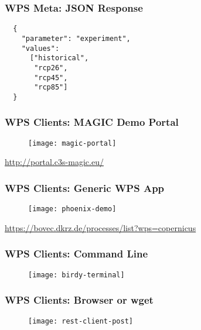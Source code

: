 \documentclass{beamer}
\begin{document}
\begin{frame}[fragile]
\frametitle<presentation>{WPS Meta: JSON Response}
  \lstset{language=JSON}
  \begin{lstlisting}
  {
    "parameter": "experiment",
    "values":
      ["historical",
       "rcp26",
       "rcp45",
       "rcp85"]
  }
  \end{lstlisting}

\end{frame}

\begin{frame}
\frametitle<presentation>{WPS Clients: MAGIC Demo Portal}

  \begin{figure}[ht]
    \centering
    \texttt{[image: magic-portal]}
  \end{figure}

  \centering
  \footnotesize{\url{http://portal.c3s-magic.eu/}}

\end{frame}

\begin{frame}
\frametitle<presentation>{WPS Clients: Generic WPS App}

  \begin{figure}[ht]
    \centering
    \texttt{[image: phoenix-demo]}
  \end{figure}

  \centering
  \footnotesize{\url{https://bovec.dkrz.de/processes/list?wps=copernicus}}

\end{frame}

\begin{frame}
\frametitle<presentation>{WPS Clients: Command Line}
  \begin{figure}[ht]
    \texttt{[image: birdy-terminal]}
  \end{figure}
\end{frame}

\begin{frame}
\frametitle<presentation>{WPS Clients: Browser or wget}

  \begin{figure}[ht]
    \texttt{[image: rest-client-post]}
  \end{figure}


\end{frame}
\end{document}

